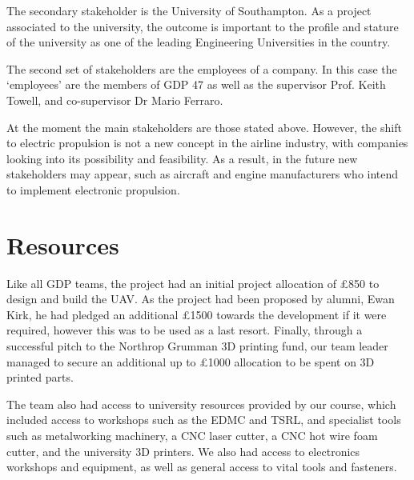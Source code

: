 \documentclass[../../main.tex]{subfiles}
\begin{document}
The secondary stakeholder is the University of Southampton.
As a project associated to the university, the outcome is important to the profile and stature of the university as one of the leading Engineering Universities in the country. 

The second set of stakeholders are the employees of a company.
In this case the ‘employees’ are the members of GDP 47 as well as the supervisor Prof. Keith Towell, and co-supervisor Dr Mario Ferraro. 

At the moment the main stakeholders are those stated above.
However, the shift to electric propulsion is not a new concept in the airline industry, with companies looking into its possibility and feasibility.
As a result, in the future new stakeholders may appear, such as aircraft and engine manufacturers who intend to implement electronic propulsion. 

\section{Resources} \label{section:design-brief:resources}

Like all GDP teams, the project had an initial project allocation of £850 to design and build the UAV.
As the project had been proposed by alumni, Ewan Kirk, he had pledged an additional £1500 towards the development if it were required, however this was to be used as a last resort.
Finally, through a successful pitch to the Northrop Grumman 3D printing fund, our team leader managed to secure an additional up to £1000 allocation to be spent on 3D printed parts. 

The team also had access to university resources provided by our course, which included access to workshops such as the EDMC and TSRL, and specialist tools such as metalworking machinery, a CNC laser cutter, a CNC hot wire foam cutter, and the university 3D printers.
We also had access to electronics workshops and equipment, as well as general access to vital tools and fasteners.
\end{document}
